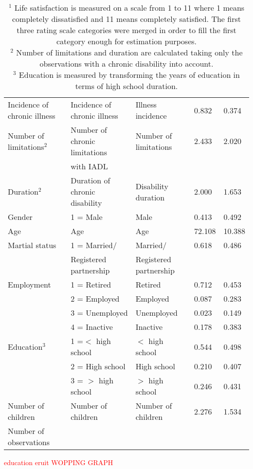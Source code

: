 \documentclass[12pt]{article}
\begin{document}
\begin{table}[h!]
\begin{tabular}{l llll}
Incidence of chronic illness & Incidence of chronic illness     & Illness incidence     & 0.832 & 0.374 \\
Number of limitations$^{2}$  & Number of chronic limitations    & Number of limitations & 2.433 & 2.020 \\
                             & with IADL                        &                       &       &       \\
Duration$^{2}$               & Duration of chronic disability   & Disability duration   & 2.000 & 1.653 \\
Gender                       & 1 = Male                         & Male                  & 0.413 & 0.492 \\
Age                          & Age                              & Age                   &72.108 &10.388 \\
Martial status               & 1 = Married/                     & Married/              & 0.618 & 0.486 \\
                             & Registered partnership           & Registered partnership&       &       \\
Employment                   & 1 = Retired                      & Retired               & 0.712 & 0.453 \\
                             & 2 = Employed                     & Employed              & 0.087 & 0.283 \\
                             & 3 = Unemployed                   & Unemployed            & 0.023 & 0.149 \\
                             & 4 = Inactive                     & Inactive              & 0.178 & 0.383 \\
Education$^{3}$              & 1 =$<$ high school               & $<$ high school       & 0.544 & 0.498 \\
                             & 2 = High school                  & High school           & 0.210 & 0.407 \\
                             & 3 = $>$ high school              & $>$ high school       & 0.246 & 0.431 \\
Number of children           & Number of children               & Number of children    & 2.276 & 1.534 \\
Number of observations &&&\\
\hline
\end{tabular}
\caption*{\footnotesize{$^{1}$ Life satisfaction is measured on a scale from 1 to 11 where 1 means completely dissatisfied and 11 means completely satisfied. The first three rating scale categories were merged in order to fill the first category enough for estimation purposes.\\
$^{2}$ Number of limitations and duration are calculated taking only the observations with a chronic disability into account.\\
$^{3}$ Education is measured by transforming the years of education in terms of high school duration. \\}}
\end{table} 
\textcolor{red}{education eruit}
\textcolor{red}{WOPPING GRAPH}
\end{document}
